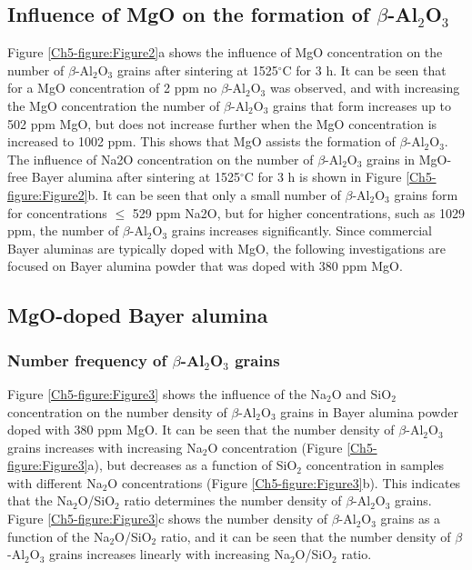 \subsection{Influence of MgO on the formation of $\beta$-Al$_{2}$O$_{3}$}

Figure \ref{Ch5-figure:Figure2}a shows the influence of MgO concentration on the number of $\beta$-Al$_{2}$O$_{3}$ grains after sintering at 1525$^{\circ}$C for 3 h. It can be seen that for a MgO concentration of 2 ppm no $\beta$-Al$_{2}$O$_{3}$ was observed, and with increasing the MgO concentration the number of $\beta$-Al$_{2}$O$_{3}$ grains that form increases up to 502 ppm MgO, but does not increase further when the MgO concentration is increased to 1002 ppm. This shows that MgO assists the formation of $\beta$-Al$_{2}$O$_{3}$. The influence of Na2O concentration on the number of $\beta$-Al$_{2}$O$_{3}$ grains in MgO-free Bayer alumina after sintering at 1525$^{\circ}$C for 3 h is shown in Figure \ref{Ch5-figure:Figure2}b. It can be seen that only a small number of $\beta$-Al$_{2}$O$_{3}$ grains form for concentrations $\leq$ 529 ppm Na2O, but for higher concentrations, such as 1029 ppm, the number of $\beta$-Al$_{2}$O$_{3}$ grains increases significantly. Since commercial Bayer aluminas are typically doped with MgO, the following investigations are focused on Bayer alumina powder that was doped with 380 ppm MgO.

\subsection{MgO-doped Bayer alumina}
\subsubsection{Number frequency of $\beta$-Al$_{2}$O$_{3}$ grains}

Figure \ref{Ch5-figure:Figure3} shows the influence of the Na$_{2}$O and SiO$_{2}$ concentration on the number density of $\beta$-Al$_{2}$O$_{3}$ grains in Bayer alumina powder doped with 380 ppm MgO. It can be seen that the number density of $\beta$-Al$_{2}$O$_{3}$ grains increases with increasing Na$_{2}$O concentration (Figure \ref{Ch5-figure:Figure3}a), but decreases as a function of SiO$_{2}$ concentration in samples with different Na$_{2}$O concentrations (Figure \ref{Ch5-figure:Figure3}b). This indicates that the Na$_{2}$O/SiO$_{2}$ ratio determines the number density of $\beta$-Al$_{2}$O$_{3}$ grains. Figure \ref{Ch5-figure:Figure3}c shows the number density of $\beta$-Al$_{2}$O$_{3}$ grains as a function of the Na$_{2}$O/SiO$_{2}$ ratio, and it can be seen that the number density of $\beta$-Al$_{2}$O$_{3}$ grains increases linearly with increasing Na$_{2}$O/SiO$_{2}$ ratio. 

